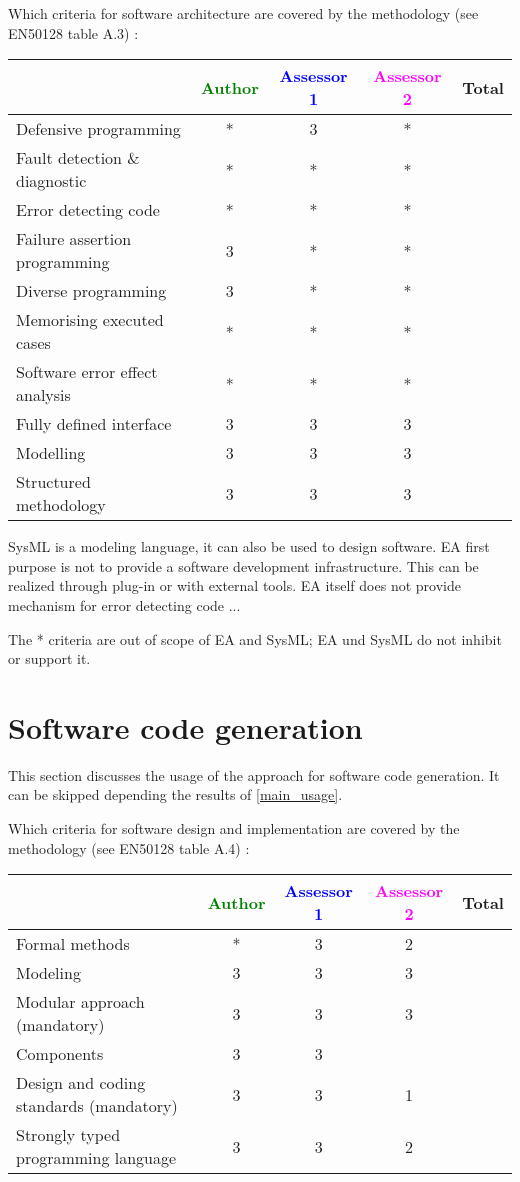Which criteria for software architecture are covered by the methodology
(see EN50128 table A.3) :

\begin{tabular}{|l | c | c | c | c|}
\hline
& \textcolor{green}{Author} & \textcolor{blue}{Assessor 1} & \textcolor{magenta}{Assessor 2} & Total \\
\hline
Defensive programming  &* & 3 & *&  \\
\hline 
Fault detection \& diagnostic  &* & *& *&  \\
\hline
Error detecting code  &* & *& *&  \\
\hline
Failure assertion programming &3 & *& *&  \\
\hline
Diverse programming &3 & *& *&  \\
\hline
Memorising executed cases &* & *&* &  \\
\hline
Software error effect analysis &* & *&* &  \\
\hline
Fully defined interface &3 & 3 & 3&  \\
\hline
Modelling  &3 & 3& 3&  \\
\hline
Structured methodology &3 & 3& 3&  \\
\hline
\end{tabular}
\begin{author_comment}
SysML is a modeling language, it can also be used to design
software. EA first purpose is not to provide a software development
infrastructure. This can be realized through plug-in or with external
tools.
EA itself does not provide mechanism for error detecting code ...
\end{author_comment}

\begin{assessor1}
The * criteria are out of scope of EA and SysML; EA und SysML do not inhibit or support it.
\end{assessor1}

\section{Software code generation}
This section discusses the usage of the approach for software code generation.
It can be skipped depending the results of \ref{main_usage}.

Which criteria for software design and implementation are covered by the methodology
(see EN50128 table A.4) :

\begin{tabular}{|l | c | c | c | c|}
\hline
& \textcolor{green}{Author} & \textcolor{blue}{Assessor 1} & \textcolor{magenta}{Assessor 2} & Total \\
\hline
Formal methods  &* & 3&  2&  \\
\hline 
Modeling  &3 & 3& 3 &  \\
\hline
Modular approach (mandatory) &3 & 3& 3&  \\
\hline
Components &3 & 3& &  \\
\hline
Design and coding standards (mandatory) &3 & 3& 1&  \\
\hline
Strongly typed programming language &3 & 3& 2 &  \\
\hline

\end{tabular}

